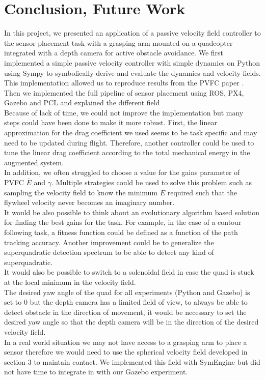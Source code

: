 \section{Conclusion, Future Work}
In this project, we presented an application of a passive velocity field controller to the sensor placement task with a grasping arm mounted on a quadcopter integrated with a depth camera for active obstacle avoidance. 
We first implemented a simple passive velocity controller with simple dynamics on Python using Sympy to symbolically derive and evaluate the dynamics and velocity fields. 
This implementation allowed us to reproduce results from the PVFC paper \cite{li1999passive}.
Then we implemented the full pipeline of sensor placement using ROS, PX4, Gazebo and PCL and explained the different field\\

Because of lack of time, we could not improve the implementation but many steps could have been done to make it more robust.
First, the linear approximation for the drag coefficient we used seems to be task specific and may need to be updated during flight. Therefore, another controller could be used to tune the linear drag coefficient 
according to the total mechanical energy in the augmented system.\\
In addition, we often struggled to choose a value for the gains parameter of PVFC $\bar{E}$ and $\gamma$. Multiple strategies could be used to solve this problem such as sampling the velocity field to know the minimum $\bar{E}$ required 
such that the flywheel velocity never becomes an imaginary number. \\
It would be also possible to think about an evolutionary algorithm based solution for finding the best gains for the task. For example, in the case of a contour following task, a fitness function could be defined as a function of the path tracking accuracy.
Another improvement could be to generalize the superquadratic detection spectrum to be able to detect any kind of superquadratic.\\
It would also be possible to switch to a solenoidal field in case the quad is stuck at the local minimum in the velocity field.\\
The desired yaw angle of the quad for all experiments (Python and Gazebo) is set to 0 but the depth camera has a limited field of view, to always be able to detect obstacle in the direction of movement, it would be necessary to set the desired yaw angle so that the depth camera will be in the direction of the desired velocity field.\\
In a real world situation we may not have access to a grasping arm to place a sensor therefore we would need to use the spherical velocity field developed in section 3 to maintain contact. We implemented this field with SymEngine but did not have time to integrate in with our Gazebo experiment. \\

